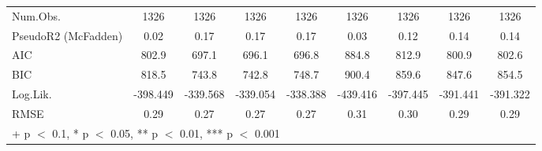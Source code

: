 \begin{table}
\begin{tabular}[t]{lcccccccc}
\midrule
Num.Obs. & 1326 & 1326 & 1326 & 1326 & 1326 & 1326 & 1326 & 1326\\
PseudoR2 (McFadden) & 0.02 & 0.17 & 0.17 & 0.17 & 0.03 & 0.12 & 0.14 & 0.14\\
AIC & 802.9 & 697.1 & 696.1 & 696.8 & 884.8 & 812.9 & 800.9 & 802.6\\
BIC & 818.5 & 743.8 & 742.8 & 748.7 & 900.4 & 859.6 & 847.6 & 854.5\\
Log.Lik. & -398.449 & -339.568 & -339.054 & -338.388 & -439.416 & -397.445 & -391.441 & -391.322\\
RMSE & 0.29 & 0.27 & 0.27 & 0.27 & 0.31 & 0.30 & 0.29 & 0.29\\
\bottomrule
\multicolumn{9}{l}{\rule{0pt}{1em}+ p $<$ 0.1, * p $<$ 0.05, ** p $<$ 0.01, *** p $<$ 0.001}\\
\end{tabular}
\end{table}
